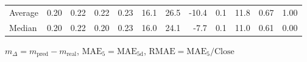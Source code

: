 \begin{threeparttable}
{\begin{tabular}{lrrrrrrrrrrr}
Average &          0.20 &          0.22 &          0.22 &        0.23 &                16.1 &                26.5 &      -10.4 &                 0.1 &             11.8 &            0.67 &                   1.00 \\
 Median &          0.20 &          0.22 &          0.20 &        0.23 &                16.0 &                24.1 &       -7.7 &                 0.1 &             11.0 &            0.61 &                   0.00 \\
\bottomrule
\end{tabular}
}
\begin{tablenotes}\footnotesize
\item $m_\Delta=m_{\text{pred}}-m_{\text{real}}$,
$\mathrm{MAE}_5=\mathrm{MAE}_{5\text{d}}$,
$\mathrm{RMAE}=\mathrm{MAE}_5/\text{Close}$
\end{tablenotes}
\end{threeparttable}
\endgroup

